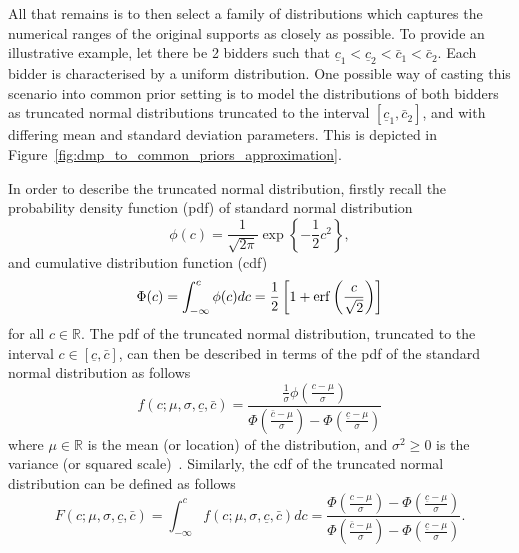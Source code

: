 All that remains is to then select a family of distributions which captures the numerical ranges of the original supports as closely as possible. To provide an illustrative example, let there be 2 bidders such that $\underline{c}_1 < \underline{c}_2 < \bar{c}_1 < \bar{c}_2$. Each bidder is characterised by a uniform distribution. One possible way of casting this scenario into common prior setting is to model the distributions of both bidders as truncated normal distributions truncated to the interval $[\underline{c}_1, \bar{c}_2]$, and with differing mean and standard deviation parameters. This is depicted in Figure~\ref{fig:dmp_to_common_priors_approximation}.

In order to describe the truncated normal distribution, firstly recall the probability density function (pdf) of standard normal distribution
\begin{equation}
  \label{eq:pdf_standard_normal_approximation}
  \displaystyle\phi(c) = \frac{1}{\sqrt{2\pi}} \exp\left\{-\frac{1}{2}c^2\right\},
\end{equation}
and cumulative distribution function (cdf)
\begin{equation}
  \label{eq:cdf_standard_normal_approximation}
  \displaystyle\Phi(c) = \int_{-\infty}^{c}\phi(c)dc = \frac{1}{2}\left[ 1 + \operatorname{erf}\left(\frac{c}{\sqrt{2}}\right) \right]
\end{equation}
for all $c\in\mathbb{R}$. The pdf of the truncated normal distribution, truncated to the interval $c\in[\underline{c},\bar{c}]$, can then be described in terms of the pdf of the standard normal distribution as follows
\begin{equation}
  \label{eq:pdf_truncated_normal_approximation}
  \displaystyle f(c; \mu, \sigma, \underline{c}, \bar{c}) = \frac{\frac{1}{\sigma}\phi\left(\frac{c-\mu}{\sigma}\right)}{\Phi\left(\frac{\bar{c}-\mu}{\sigma}\right) - \Phi\left(\frac{\underline{c}-\mu}{\sigma}\right)}
\end{equation}
where $\mu\in\mathbb{R}$ is the mean (or location) of the distribution, and $\sigma^2\geq 0$ is the variance (or squared scale)~\cite{JohnsonNormal1994,Cohen1991}. Similarly, the cdf of the truncated normal distribution can be defined as follows
\begin{equation}
  \label{eq:cdf_truncated_normal_approximation}
  \displaystyle F(c; \mu, \sigma, \underline{c}, \bar{c}) = \int_{-\infty}^{c}f(c;\mu,\sigma,\underline{c},\bar{c})dc
  = \frac{\Phi\left(\frac{c-\mu}{\sigma}\right) - \Phi\left(\frac{\underline{c}-\mu}{\sigma}\right)}{\Phi\left(\frac{\bar{c}-\mu}{\sigma}\right) - \Phi\left(\frac{\underline{c}-\mu}{\sigma}\right)}.
\end{equation}

